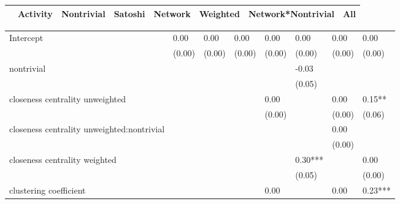 \begin{table*}
\caption{Log(Severity) model OLS parameter estimates with heteroskedasticity robust SE after ElasticNet variable selection }
\begin{center}
\begin{tabular}{lccccccc}
\hline
                                                 & Activity & Nontrivial & Satoshi & Network &   Weighted   & Network*Nontrivial &   All    \\
\hline
\hline
\end{tabular}
\begin{tabular}{llllllll}
Intercept                                        & 0.00     & 0.00       & 0.00    & 0.00    & 0.00         & 0.00               & 0.00     \\
                                                 & (0.00)   & (0.00)     & (0.00)  & (0.00)  & (0.00)       & (0.00)             & (0.00)   \\
nontrivial                                       &          &            &         &         & -0.03        &                    &          \\
                                                 &          &            &         &         & (0.05)       &                    &          \\
closeness centrality unweighted            &          &            &         & 0.00    &              & 0.00               & 0.15**   \\
                                                 &          &            &         & (0.00)  &              & (0.00)             & (0.06)   \\
closeness centrality unweighted:nontrivial &          &            &         &         &              & 0.00               &          \\
                                                 &          &            &         &         &              & (0.00)             &          \\
closeness centrality weighted              &          &            &         &         & 0.30***      &                    & 0.00     \\
                                                 &          &            &         &         & (0.05)       &                    & (0.00)   \\
clustering coefficient                     &          &            &         & 0.00    &              & 0.00               & 0.23***  \\

\end{tabular}
\end{center}
\end{table*}
